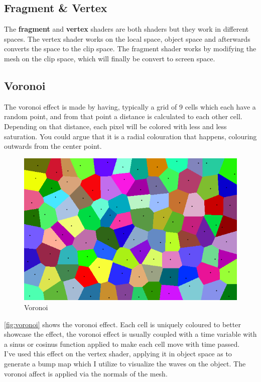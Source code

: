 \documentclass{article}
\begin{document}
\subsection{Fragment \& Vertex}
\label{sec:frag_vert}
The \textbf{fragment} and \textbf{vertex} shaders are both shaders but they work in different spaces. The vertex shader works on the local space, object space and afterwards converts the space to the clip space. The fragment shader works by modifying the mesh on the clip space, which will finally be convert to screen space\cite{progrendervertfrag}.


\subsection{Voronoi}
\label{sec:voronoi}
The voronoi effect is made by having, typically a grid of 9 cells which each have a random point, and from that point a distance is calculated to each other cell. Depending on that distance, each pixel will be colored with less and less saturation. You could argue that it is a radial colouration that happens, colouring outwards from the center point.\\

\begin{figure}[H]
    \centering
    \includegraphics[width=.75\textwidth]{img/voronoi}
    \caption{Voronoi\protect\footnotemark}
    \label{fig:voronoi}
\end{figure}
\autoref{fig:voronoi} shows the voronoi effect. Each cell is uniquely coloured to better showcase the effect, the voronoi effect is usually coupled with a time variable with a sinus or cosinus function applied to make each cell move with time passed.\\

I've used this effect on the vertex shader, applying it in object space as to generate a bump map which I utilize to visualize the waves on the object. The voronoi affect is applied via the normals of the mesh.
\end{document}
